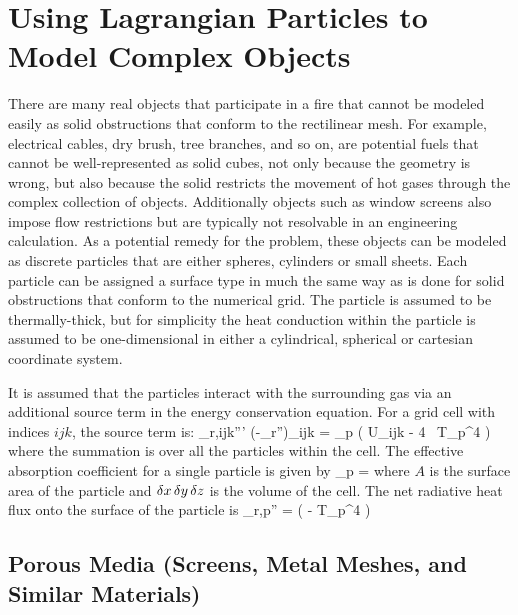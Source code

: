 \section{Using Lagrangian Particles to Model Complex Objects}

There are many real objects that participate in a fire that cannot be modeled easily as solid obstructions that conform
to the rectilinear mesh. For example, electrical cables, dry brush, tree branches, and so on, are potential fuels that cannot
be well-represented as solid cubes, not only because the geometry is wrong, but also because the solid restricts the
movement of hot gases through the complex collection of objects.  Additionally objects such as window screens also impose flow restrictions but are typically not resolvable in an engineering calculation. As a potential remedy for the problem, these objects can
be modeled as discrete particles that are either spheres, cylinders or small sheets. Each particle can be assigned a surface
type in much the same way as is done for solid obstructions that conform to the numerical grid. The particle is assumed to be
thermally-thick, but for simplicity the heat conduction within the particle is assumed to be one-dimensional in either
a cylindrical, spherical or cartesian coordinate system.

It is assumed that the particles interact with the surrounding gas via an additional source term in the energy conservation
equation. For a grid cell with indices $ijk$, the source term is:
\be \dq_{{\rm r},ijk}''' \equiv (-\nabla \cdot \dot{\bq}_{\rm r}'')_{ijk} = \sum \kappa_{\rm p} \left( U_{ijk} - 4 \sigma \, T_{\rm p}^4 \right) \ee
where the summation is over all the particles within the cell. The effective absorption coefficient for a single particle is given by
\be \kappa_{\rm p} =  \ee
where $A$ is the surface area of the particle and $\delta x \, \delta y \, \delta z$ is the volume of the cell.
The net radiative heat flux onto the surface of the particle is
\be \dq_{\rm r,p}'' = \epsilon \left(  - \sigma T_{\rm p}^4 \right) \ee

\subsection{Porous Media (Screens, Metal Meshes, and Similar Materials)}

